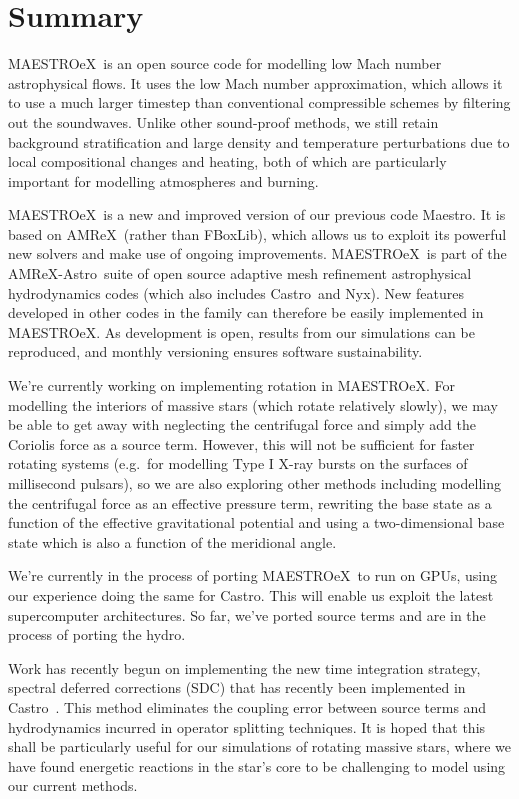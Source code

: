 \documentclass[a4paper]{jpconf}
\newcommand{\maestro}{{\sffamily Maestro}}
\newcommand{\maestroex}{{\sffamily MAESTROeX}}
\newcommand{\castro}{{\sffamily Castro}}
\newcommand{\nyx}{{\sffamily Nyx}}
\newcommand{\amrex}{{\sffamily AMReX}}
\newcommand{\amrexastro}{{\sffamily AMReX-Astro}}
\newcommand{\fboxlib}{{\sffamily FBoxLib}}
\begin{document}
\section{Summary} \label{sec:summary}

\maestroex~is an open source code for modelling low Mach number astrophysical flows. It uses the low Mach number approximation, which allows it to use a much larger timestep than conventional compressible schemes by filtering out the soundwaves. Unlike other sound-proof methods, we still retain background stratification and large density and temperature perturbations due to local compositional changes and heating, both of which are particularly important for modelling atmospheres and burning. 

\maestroex~is a new and improved version of our previous code \maestro. It is based on \amrex~(rather than \fboxlib), which allows us to exploit its powerful new solvers and make use of ongoing improvements. \maestroex~is part of the \amrexastro~suite of open source adaptive mesh refinement astrophysical hydrodynamics codes (which also includes \castro~and \nyx). New features developed in other codes in the family can therefore be easily implemented in \maestroex. As development is open, results from our simulations can be reproduced, and monthly versioning ensures software sustainability.

We're currently working on implementing rotation in \maestroex. For modelling the interiors of massive stars (which rotate relatively slowly), we may be able to get away with neglecting the centrifugal force and simply add the Coriolis force as a source term. However, this will not be sufficient for faster rotating systems (e.g.~for modelling Type I X-ray bursts on the surfaces of millisecond pulsars), so we are also exploring other methods including modelling the centrifugal force as an effective pressure term, rewriting the base state as a function of the effective gravitational potential and using a two-dimensional base state which is also a function of the meridional angle.

We're currently in the process of porting \maestroex~to run on GPUs, using our experience doing the same for \castro. This will enable us exploit the latest supercomputer architectures. So far, we've ported source terms and are in the process of porting the hydro. 

Work has recently begun on implementing the new time integration strategy, spectral deferred corrections (SDC) that has recently been implemented in \castro~\cite{castro:sdc}. This method eliminates the coupling error between source terms and hydrodynamics incurred in operator splitting techniques. It is hoped that this shall be particularly useful for our simulations of rotating massive stars, where we have found energetic reactions in the star's core to be challenging to model using our current methods. 
\end{document}
